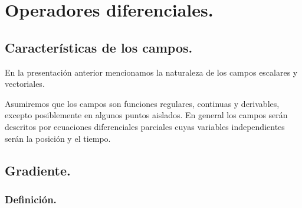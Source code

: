\documentclass[12pt]{article}
\numberwithin{equation}{section}
\begin{document}

\newpage
\section{Operadores diferenciales.}

\subsection{Características de los campos.}

En la presentación anterior mencionamos la naturaleza de los campos escalares y vectoriales.
\par
Asumiremos que los campos son funciones regulares, continuas y derivables, excepto posiblemente en algunos puntos aislados. En general los campos serán descritos por ecuaciones diferenciales parciales cuyas variables independientes serán la posición y el tiempo.

\subsection{Gradiente.}

\subsubsection{Definición.}
\end{document}
